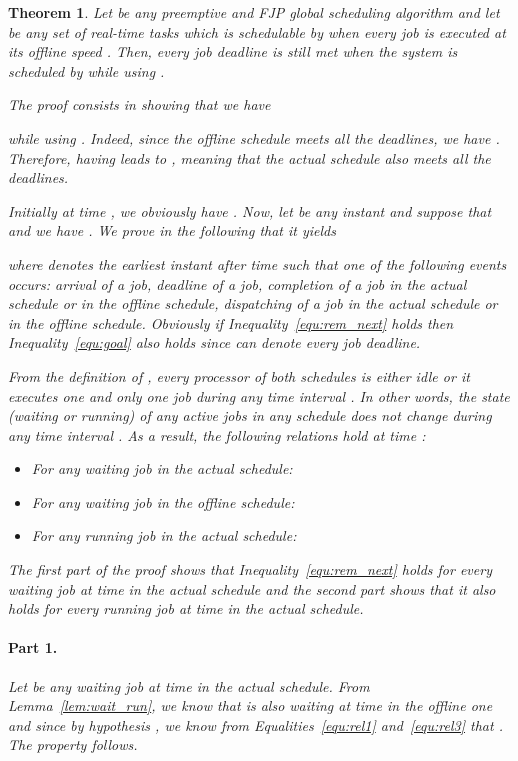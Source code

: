 \documentclass[times, 10pt,twocolumn]{article}
\newtheorem{Theorem}{Theorem}
\newenvironment{proof}[1][Proof]{\begin{trivlist}
\item[\hskip \labelsep {\bfseries #1}]}{\end{trivlist}}
\begin{document}
\begin{Theorem}
Let  be any preemptive and FJP global scheduling algorithm and let  be any set of real-time tasks which is schedulable by  when every job  is executed at its offline speed . Then, every job deadline is still met when the system is scheduled by  while using .
\begin{proof}
The proof consists in showing that  we have

while using . Indeed, since the offline schedule meets all the deadlines, we have  . Therefore, having  leads to  , meaning that the actual schedule also meets all the deadlines. 

Initially at time , we obviously have  . Now, let  be any instant and suppose that  and  we have . We prove in the following that it yields

where  denotes the earliest instant after time  such that one of the following events occurs: arrival of a job, deadline of a job, completion of a job in the actual schedule or in the offline schedule, dispatching of a job in the actual schedule or in the offline schedule. Obviously if Inequality~\ref{equ:rem_next} holds then Inequality~\ref{equ:goal} also holds since  can denote every job deadline.

From the definition of , every processor of both schedules is either idle or it executes one and only one job during any time interval . In other words, the state (waiting or running) of any active jobs in any schedule does not change during any time interval . As a result, the following relations hold at time :
\begin{itemize}
\item For any waiting job  in the actual schedule:

\item For any waiting job  in the offline schedule:

\item For any running job  in the actual schedule:

\end{itemize}

The first part of the proof shows that Inequality~\ref{equ:rem_next} holds for every waiting job at time  in the actual schedule and the second part shows that it also holds for every running job at time  in the actual schedule.

\paragraph{Part 1.} Let  be any waiting job at time  in the actual schedule. From Lemma~\ref{lem:wait_run}, we know that  is also waiting at time  in the offline one and since by hypothesis , we know from Equalities~\ref{equ:rel1} and~\ref{equ:rel3} that . The property follows.


\end{proof}
\end{Theorem}
\end{document}
